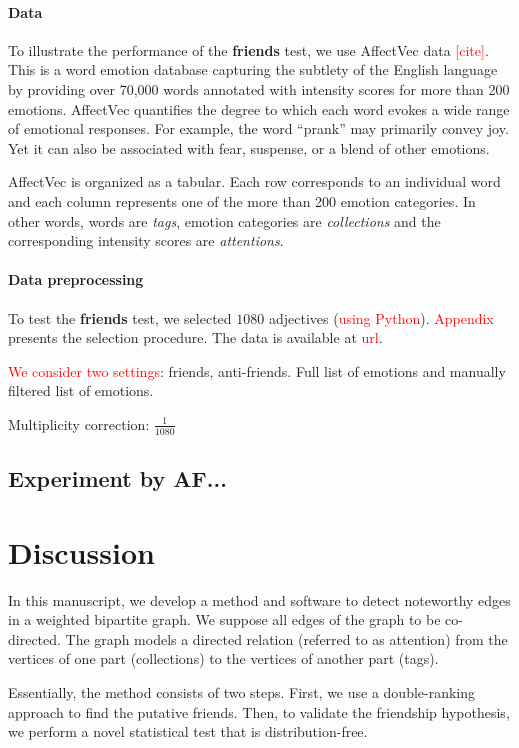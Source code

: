\documentclass{llncs}
\newcommand{\red}[1]{\textcolor{red}{#1}}
\begin{document}
\paragraph{Data} To illustrate the performance of the 
\textbf{friends} test, we use AffectVec data \red{[cite]}. This is a word emotion database capturing the subtlety of the English language by providing over 70,000 words annotated with intensity scores for more than 200 emotions. AffectVec quantifies the degree to which each word evokes a wide range of emotional responses. For example, the word ``prank'' may primarily convey joy. Yet it can also be associated with fear, suspense, or a blend of other emotions.

AffectVec is organized as a tabular. Each row corresponds to an individual word and each column represents one of the more than 200 emotion categories. In other words, words are \textit{tags}, emotion categories are \textit{collections} and the corresponding intensity scores are \textit{attentions}. 

\paragraph{Data preprocessing} To test the \textbf{friends} test, we selected $1080$ adjectives (\red{using Python}). \red{Appendix} presents the selection procedure. The data is available at \red{url}.

\red{We consider two settings}: friends, anti-friends. Full list of emotions and manually filtered list of emotions.

Multiplicity correction: $\frac{1}{1080}$

\subsection{Experiment by AF...}
\section{Discussion}

In this manuscript, we develop a method and software to detect noteworthy edges in a weighted bipartite graph. We suppose all edges of the graph to be co-directed. The graph models a directed relation (referred to as attention) from the vertices of one part (collections) to the vertices of another part (tags).

Essentially, the method consists of two steps. First, we use a double-ranking approach to find the putative friends. Then, to validate the friendship hypothesis, we perform a novel statistical test that is distribution-free.
\end{document}
